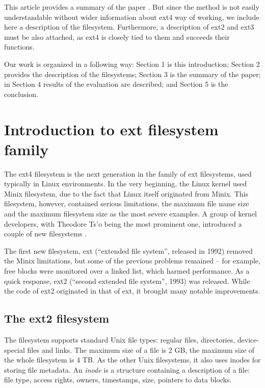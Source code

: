 \documentclass{acm_proc_article-sp}
\begin{document}
This article provides a summary of the paper \cite{afeic}. But since the method is not easily understandable without wider information about ext4 way of working, we include here a description of the filesystem. Furthermore, a description of ext2 and ext3 must be also attached, as ext4 is closely tied to them and succeeds their functions.

Our work is organized in a following way: Section 1 is this introduction; Section 2 provides the description of the filesystems; Section 3 is the summary of the paper; in Section 4 results of the evaluation are described; and Section 5 is the conclusion.

\section{Introduction to ext filesystem family}

The ext4 filesystem is the next generation in the family of ext filesystems, used typically in Linux environments. In the very beginning, the Linux kernel used Minix filesystem, due to the fact that Linux itself originated from Minix. This filesystem, however, contained serious limitations, the maximum file name size and the maximum filesystem size as the most severe examples. A group of kernel developers, with Theodore Ts'o being the most prominent one, introduced a couple of new filesystems \cite{ext2design}.

The first new filesystem, ext (``extended file system'', released in 1992) removed the Minix limitations, but some of the previous problems remained -- for example, free blocks were monitored over a linked list, which harmed performance. As a quick response, ext2 (``second extended file system'', 1993) was released. While the code of ext2 originated in that of ext, it brought many notable improvements.

\subsection{The ext2 filesystem}

The filesystem supports standard Unix file types: regular files, directories, device-special files and links. The maximum size of a file is 2 GB, the maximum size of the whole filesystem is 4 TB.
As the other Unix filesystems, it also uses inodes for storing file metadata. An {\it inode} is a structure containing a description of a file: file type, access rights, owners, timestamps, size, pointers to data blocks.
\end{document}
